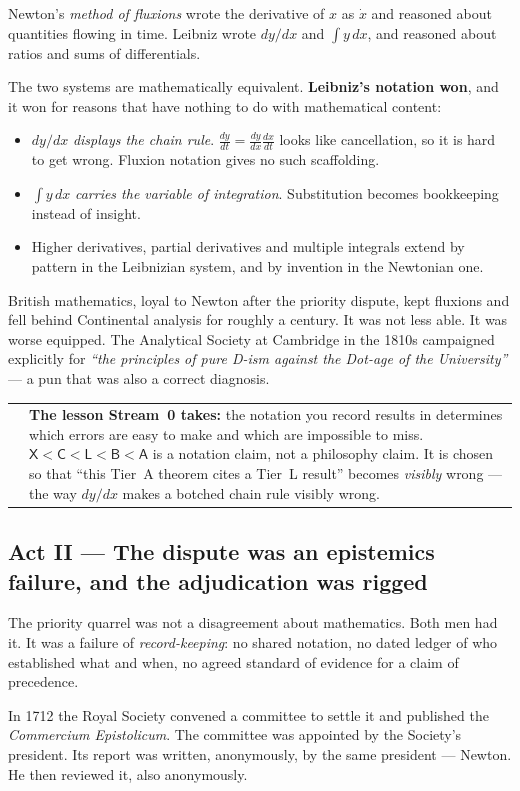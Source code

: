 \documentclass[11pt,a4paper]{article}
\makeatletter
\newcommand{\caveat}[1]{%
  \par\vspace{0.6em}\noindent
  \begin{tabular}{@{}p{0.4em}@{\hspace{0.8em}}p{\dimexpr\linewidth-2.2em\relax}@{}}
  \textcolor{rulegray}{\rule{2pt}{\baselineskip}} & \small #1
  \end{tabular}\par\vspace{0.6em}}
\newcommand{\tierorder}{\ensuremath{\mathsf{X} < \mathsf{C} < \mathsf{L} < \mathsf{B} < \mathsf{A}}}
\makeatother
\begin{document}
Newton's \emph{method of fluxions} wrote the derivative of $x$ as $\dot{x}$ and reasoned about
quantities flowing in time. Leibniz wrote $dy/dx$ and $\int y\,dx$, and reasoned about ratios and
sums of differentials.

The two systems are mathematically equivalent. \textbf{Leibniz's notation won}, and it won for
reasons that have nothing to do with mathematical content:

\begin{itemize}
\item $dy/dx$ \emph{displays the chain rule}. $\frac{dy}{dt} = \frac{dy}{dx}\frac{dx}{dt}$ looks
like cancellation, so it is hard to get wrong. Fluxion notation gives no such scaffolding.
\item $\int y\,dx$ \emph{carries the variable of integration}. Substitution becomes bookkeeping
instead of insight.
\item Higher derivatives, partial derivatives and multiple integrals extend by pattern in the
Leibnizian system, and by invention in the Newtonian one.
\end{itemize}

British mathematics, loyal to Newton after the priority dispute, kept fluxions and fell behind
Continental analysis for roughly a century. It was not less able. It was worse equipped. The
Analytical Society at Cambridge in the 1810s campaigned explicitly for \emph{``the principles of
pure D-ism against the Dot-age of the University''} — a pun that was also a correct diagnosis.

\caveat{\textbf{The lesson Stream~0 takes:} the notation you record results in determines which
errors are easy to make and which are impossible to miss. \tierorder{} is a notation claim, not a
philosophy claim. It is chosen so that ``this Tier~A theorem cites a Tier~L result'' becomes
\emph{visibly} wrong — the way $dy/dx$ makes a botched chain rule visibly wrong.}

\subsection*{Act II — The dispute was an epistemics failure, and the adjudication was rigged}

The priority quarrel was not a disagreement about mathematics. Both men had it. It was a failure
of \emph{record-keeping}: no shared notation, no dated ledger of who established what and when,
no agreed standard of evidence for a claim of precedence.

In 1712 the Royal Society convened a committee to settle it and published the
\emph{Commercium Epistolicum}. The committee was appointed by the Society's president. Its report
was written, anonymously, by the same president — Newton. He then reviewed it, also anonymously.
\end{document}
